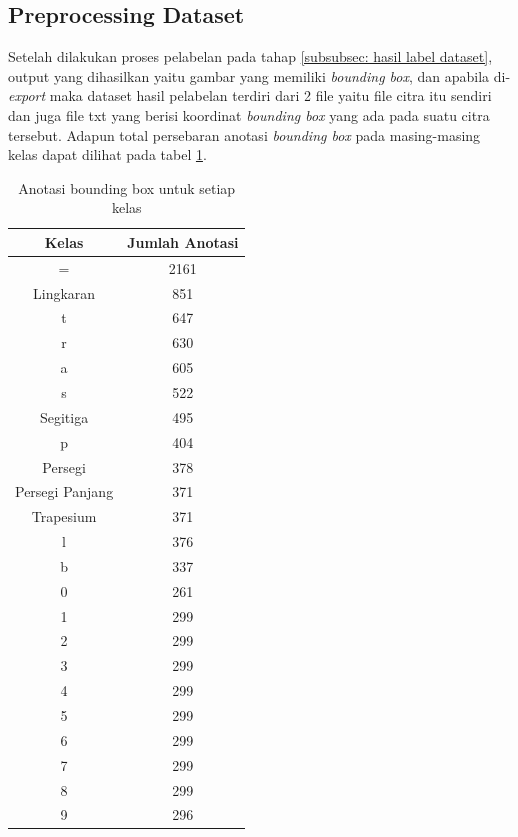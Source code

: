 \subsection{Preprocessing Dataset}
\label{subsec:preproses}
Setelah dilakukan proses pelabelan pada tahap \ref{subsubsec: hasil label dataset}, output yang dihasilkan yaitu gambar yang memiliki \textit{bounding box}, dan apabila di-\textit{export} maka dataset hasil pelabelan terdiri dari 2 file yaitu file citra itu sendiri dan juga file txt yang berisi koordinat \textit{bounding box} yang ada pada suatu citra tersebut. Adapun total persebaran anotasi \textit{bounding box} pada masing-masing kelas dapat dilihat pada tabel \ref{tab:prep}.
\begin{table}[H]
\centering
	\caption{Anotasi bounding box untuk setiap kelas}
	\begin{tabular}{c c} 
		\toprule
		Kelas & Jumlah Anotasi \\ [0.5ex] 
		\midrule
		= & 2161 \\ 
		\midrule
		Lingkaran & 851 \\
		\midrule
		t & 647\\
		\midrule
		r & 630\\
		\midrule
		a & 605\\
		\midrule
		s & 522\\
		\midrule
		Segitiga & 495\\
		\midrule
		p & 404\\
		\midrule
		Persegi & 378\\
		\midrule
		Persegi Panjang & 371\\
		\midrule
		Trapesium & 371\\
		\midrule
		l & 376\\
		\midrule
		b & 337\\
		\midrule
		0 & 261\\
		\midrule
		1 & 299\\
		\midrule
		2 & 299\\
		\midrule
		3 & 299\\
		\midrule
		4 & 299\\
		\midrule
		5 & 299\\
		\midrule
		6 & 299\\
		\midrule
		7 & 299\\
		\midrule
		8 & 299\\
		\midrule
		9 & 296 \\ [1ex] 
		\bottomrule
	\end{tabular}
	\label{tab:prep}
\end{table}

